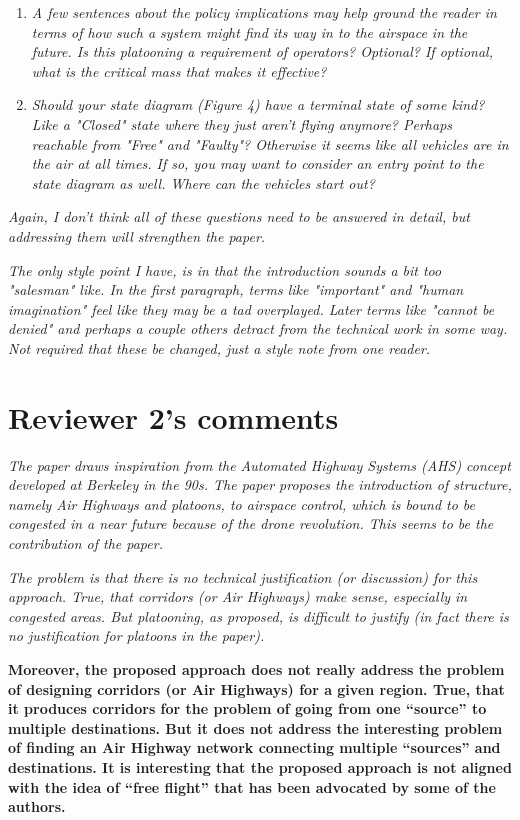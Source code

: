 \documentclass[submit]{aiaa-pretty}
\begin{document}
\begin{enumerate}
\item\textit{A few sentences about the policy implications may help ground the reader in terms of how such a system might find its way in to the airspace in the future.  Is this platooning a requirement of operators?  Optional?  If optional, what is the critical mass that makes it effective?}

\item\textit{Should your state diagram (Figure 4) have a terminal state of some kind?  Like a "Closed" state where they just aren't flying anymore?  Perhaps reachable from "Free" and "Faulty"?  Otherwise it seems like all vehicles are in the air at all times.  If so, you may want to consider an entry point to the state diagram as well.  Where can the vehicles start out?}
\end{enumerate}

\textit{Again, I don't think all of these questions need to be answered in detail, but addressing them will strengthen the paper.}

\textit{The only style point I have, is in that the introduction sounds a bit too "salesman" like.  In the first paragraph, terms like "important" and "human imagination" feel like they may be a tad overplayed.  Later terms like "cannot be denied" and perhaps a couple others detract from the technical work in some way.  Not required that these be changed, just a style note from one reader.}

\section{Reviewer 2's comments}

\textit{The paper draws inspiration from the Automated Highway Systems (AHS) concept developed at Berkeley in the 90s. The paper proposes the introduction of structure, namely Air Highways and platoons, to airspace control, which is bound to be congested in a near future because of the drone revolution. This seems to be the contribution of the paper.} 

\textit{The problem is that there is no technical justification (or discussion) for this approach. True, that corridors (or Air Highways) make sense, especially in congested areas. But platooning, as proposed, is difficult to justify (in fact there is no justification for platoons in the paper).}

\textbf{Moreover, the proposed approach does not really address the problem of designing corridors (or Air Highways) for a given region. True, that it produces corridors for the problem of going from one “source” to multiple destinations. But it does not address the interesting problem of finding an Air Highway network connecting multiple “sources” and destinations. It is interesting that the proposed approach is not aligned with the idea of “free flight” that has been advocated by some of the authors.}
\end{document}
